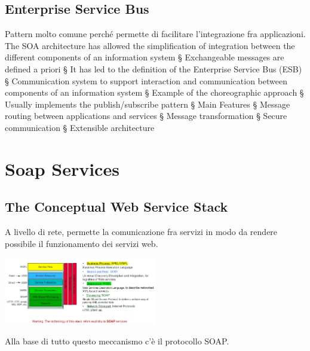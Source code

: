 \section{Enterprise Service Bus}
Pattern molto comune perché permette di facilitare l'integrazione fra applicazioni.
The SOA architecture has allowed the simplification of integration between the different components of an
information system
§ Exchangeable messages are defined a priori
§ It has led to the definition of the Enterprise Service Bus (ESB)
§ Communication system to support interaction and communication between components of an information system
§ Example of the choreographic approach
§ Usually implements the publish/subscribe pattern
§ Main Features
§ Message routing between applications and services
§ Message transformation
§ Secure communication
§ Extensible architecture

\chapter{Soap Services}
\section{The Conceptual Web Service Stack}
A livello di rete, permette la comunicazione fra servizi in modo da rendere possibile il funzionamento dei servizi web.
\begin{center}
    \includegraphics[width=0.5\textwidth]{img/SoapServices1.jpg}
\end{center}
Alla base di tutto questo meccanismo c'è il protocollo SOAP.

